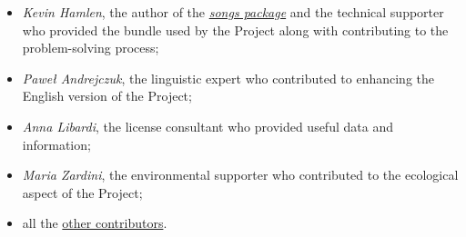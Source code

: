 % 
% 
% 
% 

\begin{itemize}
	\item {\textit{\rmfamily Kevin Hamlen}}, the author of the \href{http://songs.sourceforge.net/}{\textit{songs package}} and the technical supporter who provided the bundle used by the Project along with contributing to the problem-solving process;
	\item {\textit{\rmfamily Paweł Andrejczuk}}, the linguistic expert who contributed to enhancing the English version of the Project;
	\item {\textit{\rmfamily Anna Libardi}}, the license consultant who provided useful data and information;
	\item {\textit{\rmfamily Maria Zardini}}, the environmental supporter who contributed to the ecological aspect of the Project;
  \item all the \href{https://github.com/PietroPrandini/GuitarHub/graphs/contributors}{other contributors}.
\end{itemize}
